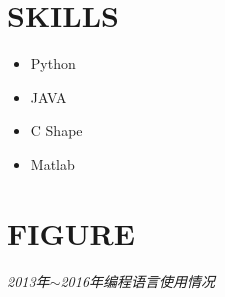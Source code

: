 \documentclass[line, margin]{res}
\begin{document}
\begin{resume}
\section{SKILLS}
\begin{itemize}
\item Python
\item JAVA
\item C Shape
\item Matlab
\end{itemize}

\section{FIGURE}
 {\sl 2013年$\sim$2016{ 年编程语言使用情况}} \\ 
[5pt]

\end{resume}
\end{document}
